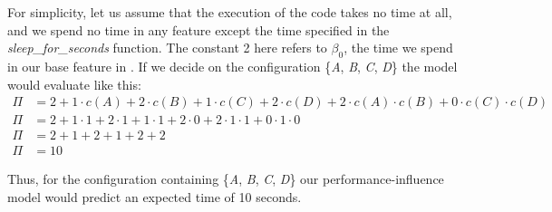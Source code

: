 For simplicity, let us assume that the execution of the code takes no time at all, and we spend no time in any feature except the time specified in the 
\textit{sleep\_for\_seconds} function.
The constant 2 here refers to $\beta_0$, the time we spend in our base feature in .
If we decide on the configuration \{\emph{A}, \emph{B}, \emph{C}, \emph{D}\} the model would evaluate like this:
\begin{align*}
    \Pi &= 2 + 1 \cdot c(A) + 2\cdot c(B) + 1\cdot c(C) + 2\cdot c(D) + 2 \cdot c(A)\cdot c(B) + 0\cdot c(C) \cdot c(D) \\
    \Pi &= 2 + 1 \cdot 1 + 2 \cdot 1 + 1 \cdot 1 + 2 \cdot 0 + 2 \cdot 1 \cdot 1 + 0 \cdot 1 \cdot 0 \\
    \Pi &= 2 + 1 + 2 + 1 + 2 + 2 \\
    \Pi &= 10
\end{align*}

Thus, for the configuration containing \{\emph{A}, \emph{B}, \emph{C}, \emph{D}\} our performance-influence model would predict an expected time of 10 seconds.
